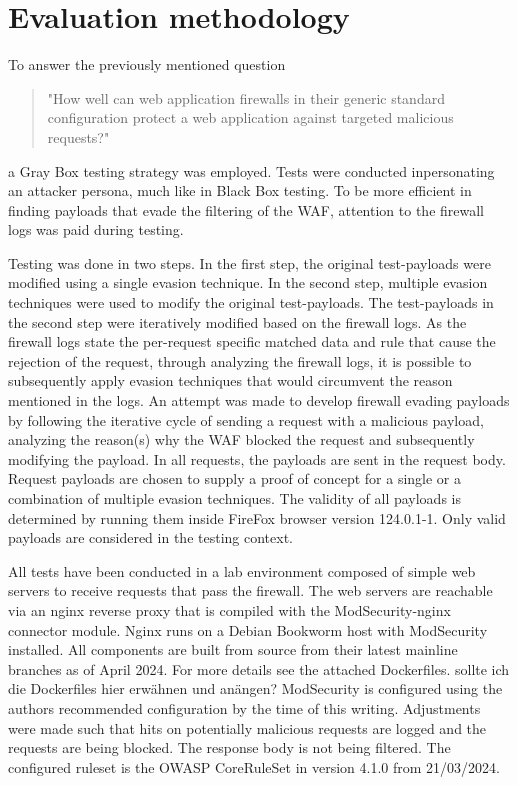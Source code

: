 \section{Evaluation methodology}
\label{sec:evaluation}
To answer the previously mentioned question
\begin{quote} "How well can web application firewalls in their generic standard configuration protect a web application against targeted malicious requests?"
\end{quote}
a Gray Box testing strategy was employed. Tests were conducted inpersonating an attacker persona, much like in Black Box testing.
To be more efficient in finding payloads that evade the filtering of the WAF, attention to the firewall logs was paid during testing.

Testing was done in two steps. In the first step, the original test-payloads were modified using a single evasion technique.
In the second step, multiple evasion techniques were used to modify the original test-payloads.
The test-payloads in the second step were iteratively modified based on the firewall logs.
As the firewall logs state the per-request specific matched data and rule that cause the rejection of the request, through analyzing the firewall logs, it is possible to subsequently apply evasion techniques that would circumvent the reason mentioned in the logs.
An attempt was made to develop firewall evading payloads by following the iterative cycle of sending a request with a malicious payload, analyzing the reason(s) why the WAF blocked the request and subsequently modifying the payload. In all requests, the payloads are sent in the request body.
Request payloads are chosen to supply a proof of concept for a single or a combination of multiple evasion techniques. The validity of all payloads is determined by running them inside FireFox browser version 124.0.1-1. Only valid payloads are considered in the testing context. %

All tests have been conducted in a lab environment composed of simple web servers to receive requests that pass the firewall.
The web servers are reachable via an nginx reverse proxy that is compiled with the ModSecurity-nginx connector module. Nginx runs on a Debian Bookworm host with ModSecurity installed.
All components are built from source from their latest mainline branches as of April 2024.
For more details see the attached Dockerfiles.
	{\color{red} sollte ich die Dockerfiles hier erwähnen und anängen?}
ModSecurity is configured using the authors recommended configuration by the time of this writing. \cite{modsec/recconf}
Adjustments were made such that hits on potentially malicious requests are logged and the requests are being blocked. The response body is not being filtered.
The configured ruleset is the OWASP CoreRuleSet in version 4.1.0 from 21/03/2024. \cite{crs/410dl}
